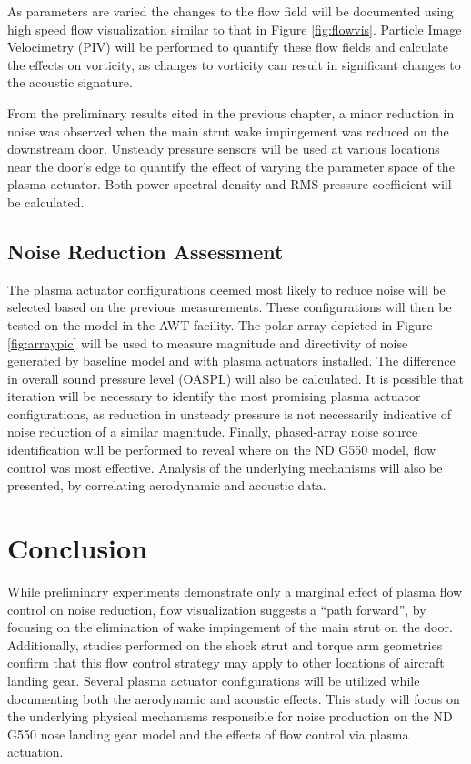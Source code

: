 As parameters are varied the changes to the flow field will be documented using high speed flow visualization similar to that in Figure \ref{fig:flowvis}. Particle Image Velocimetry (PIV) will be performed to quantify these flow fields and calculate the effects on vorticity, as changes to vorticity can result in significant changes to the acoustic signature.

From the preliminary results cited in the previous chapter, a minor reduction in noise was observed when the main strut wake impingement was reduced on the downstream door. Unsteady pressure sensors will be used at various locations near the door's edge to quantify the effect of varying the parameter space of the plasma actuator. Both power spectral density and RMS pressure coefficient will be calculated.

\subsection{Noise Reduction Assessment}
The plasma actuator configurations deemed most likely to reduce noise will be selected based on the previous measurements. These configurations will then be tested on the model in the AWT facility. 
The polar array depicted in Figure \ref{fig:arraypic} will be used to measure magnitude and directivity of noise generated by baseline model and with plasma actuators installed. The difference in overall sound pressure level (OASPL) will also be calculated.
It is possible that iteration will be necessary to identify the most promising plasma actuator configurations, as reduction in unsteady pressure is not necessarily indicative of noise reduction of a similar magnitude. 
Finally, phased-array noise source identification will be performed to reveal where on the ND G550 model, flow control was most effective. Analysis of the underlying mechanisms will also be presented, by correlating aerodynamic and acoustic data.

\section{Conclusion}
While preliminary experiments demonstrate only a marginal effect of plasma flow control on noise reduction, flow visualization suggests a ``path forward'', by focusing on the elimination of wake impingement of the main strut on the door. Additionally, studies performed on the shock strut and torque arm geometries confirm that this flow control strategy may apply to other locations of aircraft landing gear. Several plasma actuator configurations will be utilized while documenting both the aerodynamic and acoustic effects. This study will focus on the underlying physical mechanisms responsible for noise production on the ND G550 nose landing gear model and the effects of flow control via plasma actuation.